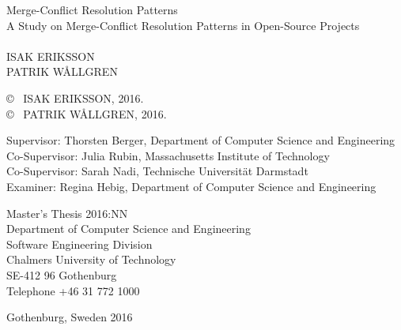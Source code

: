 \newpage
\thispagestyle{plain}
\vspace*{4.5cm}
Merge-Conflict Resolution Patterns\\
A Study on Merge-Conflict Resolution Patterns in Open-Source Projects\\\\
ISAK ERIKSSON \setlength{\parskip}{1cm}\\
PATRIK WÅLLGREN \setlength{\parskip}{1cm}

\copyright ~ ISAK ERIKSSON, 2016. \setlength{\parskip}{1cm}\\
\copyright ~ PATRIK WÅLLGREN, 2016. \setlength{\parskip}{1cm}

Supervisor: Thorsten Berger, Department of Computer Science and Engineering\\
Co-Supervisor: Julia Rubin, Massachusetts Institute of Technology\\
Co-Supervisor: Sarah Nadi, Technische Universität Darmstadt\\
Examiner: Regina Hebig, Department of Computer Science and Engineering\setlength{\parskip}{1cm}

Master's Thesis 2016:NN\\	%
Department of Computer Science and Engineering\\
Software Engineering Division\\
Chalmers University of Technology\\
SE-412 96 Gothenburg\\
Telephone +46 31 772 1000 \setlength{\parskip}{0.5cm}

\vfill

Gothenburg, Sweden 2016

